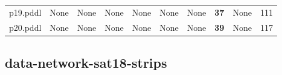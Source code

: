 \documentclass{article}
\begin{document}
\begin{tabular}{@{}lrrrrrrrrr@{}}
p19.pddl & \multicolumn{1}{|l|}{None} & \multicolumn{1}{|l|}{None} & \multicolumn{1}{|l|}{None} & \multicolumn{1}{|l|}{None} & \multicolumn{1}{|l|}{None} & \multicolumn{1}{|l|}{None} & \textbf{37} & \multicolumn{1}{|l|}{None} & 111 \\
p20.pddl & \multicolumn{1}{|l|}{None} & \multicolumn{1}{|l|}{None} & \multicolumn{1}{|l|}{None} & \multicolumn{1}{|l|}{None} & \multicolumn{1}{|l|}{None} & \multicolumn{1}{|l|}{None} & \textbf{39} & \multicolumn{1}{|l|}{None} & 117 \\
\end{tabular}

\hypertarget{restrictions-data-network-sat18-strips}{}
\subsection*{data-network-sat18-strips}
\end{document}
